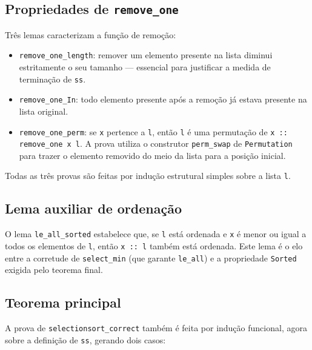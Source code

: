 \documentclass{article}
\begin{document}
\subsection{Propriedades de \texttt{remove\_one}}

Três lemas caracterizam a função de remoção:

\begin{itemize}
  \item \texttt{remove\_one\_length}: remover um elemento presente na lista
        diminui estritamente o seu tamanho — essencial para justificar a
        medida de terminação de \texttt{ss}.
  \item \texttt{remove\_one\_In}: todo elemento presente após a remoção já
        estava presente na lista original.
  \item \texttt{remove\_one\_perm}: se \texttt{x} pertence a \texttt{l},
        então \texttt{l} é uma permutação de \texttt{x :: remove\_one x l}.
        A prova utiliza o construtor \texttt{perm\_swap} de
        \texttt{Permutation} para trazer o elemento removido do meio da
        lista para a posição inicial.
\end{itemize}

Todas as três provas são feitas por indução estrutural simples sobre a
lista \texttt{l}.

\subsection{Lema auxiliar de ordenação}

O lema \texttt{le\_all\_sorted} estabelece que, se \texttt{l} está ordenada
e \texttt{x} é menor ou igual a todos os elementos de \texttt{l}, então
\texttt{x :: l} também está ordenada. Este lema é o elo entre a corretude de
\texttt{select\_min} (que garante \texttt{le\_all}) e a propriedade
\texttt{Sorted} exigida pelo teorema final.

\subsection{Teorema principal}

A prova de \texttt{selectionsort\_correct} também é feita por indução
funcional, agora sobre a definição de \texttt{ss}, gerando dois casos:
\end{document}
